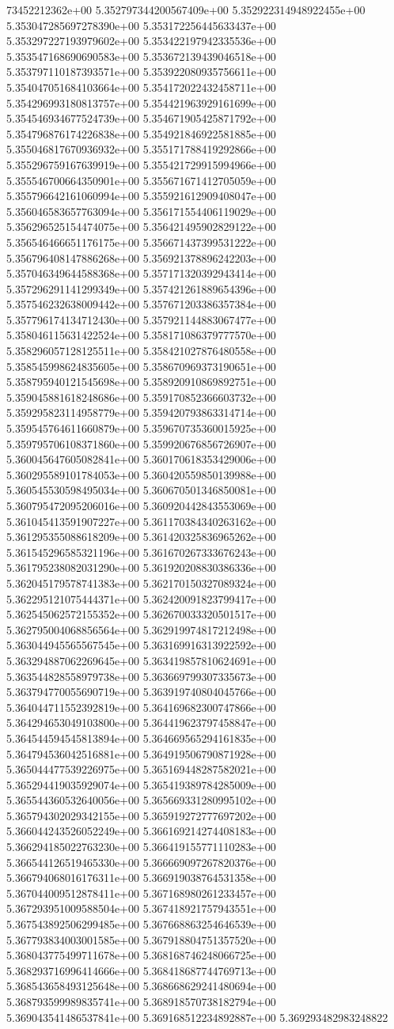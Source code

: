 73452212362e+00	5.352797344200567409e+00	5.352922314948922455e+00	5.353047285697278390e+00	5.353172256445633437e+00	5.353297227193979602e+00	5.353422197942335536e+00	5.353547168690690583e+00	5.353672139439046518e+00	5.353797110187393571e+00	5.353922080935756611e+00	5.354047051684103664e+00	5.354172022432458711e+00	5.354296993180813757e+00	5.354421963929161699e+00	5.354546934677524739e+00	5.354671905425871792e+00	5.354796876174226838e+00	5.354921846922581885e+00	5.355046817670936932e+00	5.355171788419292866e+00	5.355296759167639919e+00	5.355421729915994966e+00	5.355546700664350901e+00	5.355671671412705059e+00	5.355796642161060994e+00	5.355921612909408047e+00	5.356046583657763094e+00	5.356171554406119029e+00	5.356296525154474075e+00	5.356421495902829122e+00	5.356546466651176175e+00	5.356671437399531222e+00	5.356796408147886268e+00	5.356921378896242203e+00	5.357046349644588368e+00	5.357171320392943414e+00	5.357296291141299349e+00	5.357421261889654396e+00	5.357546232638009442e+00	5.357671203386357384e+00	5.357796174134712430e+00	5.357921144883067477e+00	5.358046115631422524e+00	5.358171086379777570e+00	5.358296057128125511e+00	5.358421027876480558e+00	5.358545998624835605e+00	5.358670969373190651e+00	5.358795940121545698e+00	5.358920910869892751e+00	5.359045881618248686e+00	5.359170852366603732e+00	5.359295823114958779e+00	5.359420793863314714e+00	5.359545764611660879e+00	5.359670735360015925e+00	5.359795706108371860e+00	5.359920676856726907e+00	5.360045647605082841e+00	5.360170618353429006e+00	5.360295589101784053e+00	5.360420559850139988e+00	5.360545530598495034e+00	5.360670501346850081e+00	5.360795472095206016e+00	5.360920442843553069e+00	5.361045413591907227e+00	5.361170384340263162e+00	5.361295355088618209e+00	5.361420325836965262e+00	5.361545296585321196e+00	5.361670267333676243e+00	5.361795238082031290e+00	5.361920208830386336e+00	5.362045179578741383e+00	5.362170150327089324e+00	5.362295121075444371e+00	5.362420091823799417e+00	5.362545062572155352e+00	5.362670033320501517e+00	5.362795004068856564e+00	5.362919974817212498e+00	5.363044945565567545e+00	5.363169916313922592e+00	5.363294887062269645e+00	5.363419857810624691e+00	5.363544828558979738e+00	5.363669799307335673e+00	5.363794770055690719e+00	5.363919740804045766e+00	5.364044711552392819e+00	5.364169682300747866e+00	5.364294653049103800e+00	5.364419623797458847e+00	5.364544594545813894e+00	5.364669565294161835e+00	5.364794536042516881e+00	5.364919506790871928e+00	5.365044477539226975e+00	5.365169448287582021e+00	5.365294419035929074e+00	5.365419389784285009e+00	5.365544360532640056e+00	5.365669331280995102e+00	5.365794302029342155e+00	5.365919272777697202e+00	5.366044243526052249e+00	5.366169214274408183e+00	5.366294185022763230e+00	5.366419155771110283e+00	5.366544126519465330e+00	5.366669097267820376e+00	5.366794068016176311e+00	5.366919038764531358e+00	5.367044009512878411e+00	5.367168980261233457e+00	5.367293951009588504e+00	5.367418921757943551e+00	5.367543892506299485e+00	5.367668863254646539e+00	5.367793834003001585e+00	5.367918804751357520e+00	5.368043775499711678e+00	5.368168746248066725e+00	5.368293716996414666e+00	5.368418687744769713e+00	5.368543658493125648e+00	5.368668629241480694e+00	5.368793599989835741e+00	5.368918570738182794e+00	5.369043541486537841e+00	5.369168512234892887e+00	5.369293482983248822